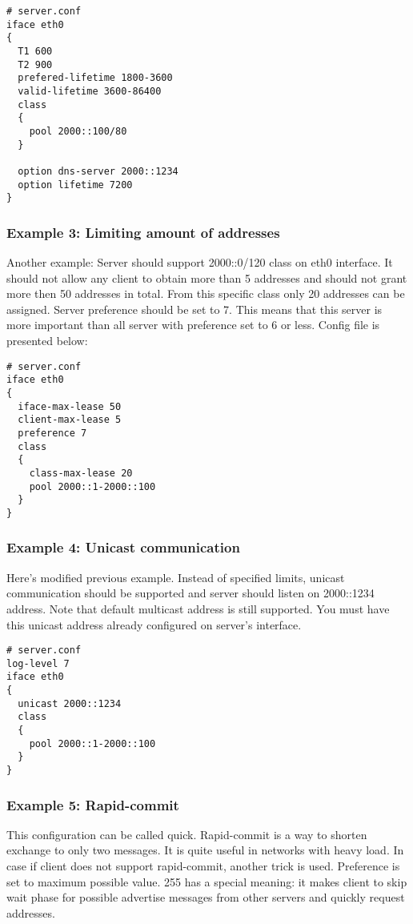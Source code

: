 \begin{lstlisting}
# server.conf
iface eth0 
{
  T1 600
  T2 900
  prefered-lifetime 1800-3600
  valid-lifetime 3600-86400
  class
  {
    pool 2000::100/80
  } 

  option dns-server 2000::1234
  option lifetime 7200
}
\end{lstlisting}

\subsubsection{Example 3: Limiting amount of addresses}
Another example: Server should support 2000::0/120 class on eth0
interface. It should not allow any client to obtain more than 5
addresses and should not grant more then 50 addresses in total. From
this specific class only 20 addresses can be assigned. Server
preference should be set to 7. This means that this server is more
important than all server with preference set to 6 or less. 
Config file is presented below:

\begin{lstlisting}
# server.conf
iface eth0
{
  iface-max-lease 50
  client-max-lease 5
  preference 7
  class
  {
    class-max-lease 20
    pool 2000::1-2000::100
  }
}  
\end{lstlisting}

\subsubsection{Example 4: Unicast communication}
\label{example-server-unicast}

Here's modified previous example. Instead of specified limits, unicast
communication should be supported and server should listen on
2000::1234 address. Note that default multicast address is still
supported. You must have this unicast address already configured on 
server's interface.

\begin{lstlisting}
# server.conf
log-level 7
iface eth0
{
  unicast 2000::1234
  class
  {
    pool 2000::1-2000::100
  }
}  
\end{lstlisting}

\subsubsection{Example 5: Rapid-commit}
This configuration can be called quick. Rapid-commit is a way to shorten exchange to only two messages. It is
quite useful in networks with heavy load. In case if client does not
support rapid-commit, another trick is used. Preference is set to
maximum possible value. 255 has a special meaning: it makes client to
skip wait phase for possible advertise messages from other servers and
quickly request addresses.

